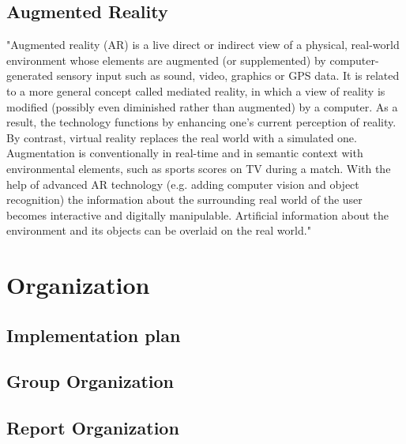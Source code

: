 \section{Augmented Reality}
"Augmented reality (AR) is a live direct or indirect view of a physical, real-world environment whose elements are augmented (or supplemented) by computer-generated sensory input such as sound, video, graphics or GPS data. It is related to a more general concept called mediated reality, in which a view of reality is modified (possibly even diminished rather than augmented) by a computer. As a result, the technology functions by enhancing one’s current perception of reality. By contrast, virtual reality replaces the real world with a simulated one. Augmentation is conventionally in real-time and in semantic context with environmental elements, such as sports scores on TV during a match. With the help of advanced AR technology (e.g. adding computer vision and object recognition) the information about the surrounding real world of the user becomes interactive and digitally manipulable. Artificial information about the environment and its objects can be overlaid on the real world."\cite{WikiAugmentedReality}



\chapter{Organization}

\section{Implementation plan}

\section{Group Organization}

\section{Report Organization}


